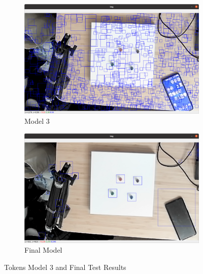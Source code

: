 \documentclass[12pt]{article}
\begin{document}
\begin{figure}[H]
    \ContinuedFloat
    \begin{subfigure}{1\textwidth}
        \includegraphics[width=\textwidth]{images/figures/app2c}
        \caption{Model 3}
        \label{fig:tokens3}
    \end{subfigure}
    \begin{subfigure}{1\textwidth}
        \includegraphics[width=\textwidth]{images/figures/app2d}
        \caption{Final Model}
        \label{fig:tokens4}
    \end{subfigure}
    
    \caption{Tokens Model 3 and Final Test Results}
    \label{fig:main}
\end{figure}


\printbibliography

\end{document}
